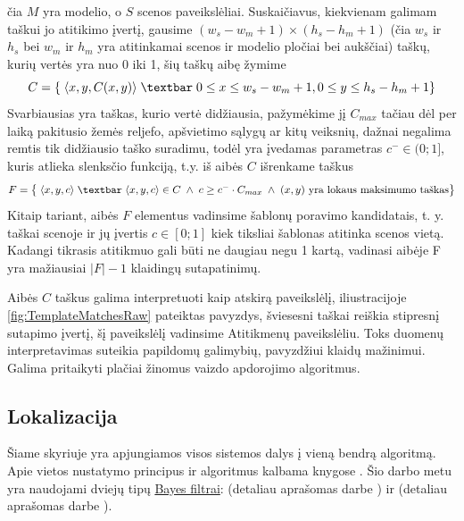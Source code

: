 \documentclass[a4paper,12pt]{article}
\begin{document}
		čia $M$ yra modelio, o $S$ scenos paveikslėliai. Suskaičiavus, kiekvienam galimam taškui jo atitikimo įvertį, gausime $(w_s-w_m+1) \times (h_s-h_m+1)$ (čia $w_s$ ir $h_s$ bei $w_m$ ir $h_m$ yra atitinkamai scenos ir modelio pločiai bei aukščiai) taškų, kurių vertės yra nuo 0 iki 1, šių taškų aibę žymime 
		\begin{equation}
		C =  \{\; \langle x, y, C(x,y) \rangle \; \textbar \; 0 \leq x \leq w_s-w_m+1, 0 \leq y \leq h_s-h_m+1\}
		\end{equation}
		Svarbiausias yra taškas, kurio vertė didžiausia, pažymėkime jį $C_{max}$ tačiau dėl per laiką pakitusio žemės reljefo, apšvietimo sąlygų ar kitų veiksnių, dažnai negalima remtis tik didžiausio taško suradimu, todėl yra įvedamas parametras $c^- \in (0;1]$, kuris atlieka slenksčio funkciją, t.y. iš aibės $C$ išrenkame taškus
		\begin{equation}
		\label{eq:TemplateMathingFilteredResult}
		 F = \left\{\; \langle x, y, c \rangle \; \textbar \; \langle x, y, c \rangle \in C  \; \land \; c \geq c^- \cdot C_{max} \; \land \; (x,y)\text{ yra lokaus maksimumo taškas} \right\}
		\end{equation}
		Kitaip tariant, aibės $F$ elementus vadinsime šablonų poravimo kandidatais, t. y. taškai scenoje ir jų įvertis $c \in [0;1]$ kiek tiksliai šablonas atitinka scenos vietą. Kadangi tikrasis atitikmuo gali būti ne daugiau negu 1 kartą, vadinasi aibėje F yra mažiausiai $|F| - 1$ klaidingų sutapatinimų. 
		
		Aibės $C$ taškus galima interpretuoti kaip atskirą paveikslėlį, iliustracijoje \ref{fig:TemplateMatchesRaw} pateiktas pavyzdys, šviesesni taškai reiškia stipresnį sutapimo įvertį, šį paveikslėlį vadinsime Atitikmenų paveikslėliu. Toks duomenų interpretavimas suteikia papildomų galimybių, pavyzdžiui klaidų mažinimui. Galima pritaikyti plačiai žinomus vaizdo apdorojimo algoritmus.		
				
	\subsection{Lokalizacija}	
		\label{sec:Localization}
				
		Šiame skyriuje yra apjungiamos visos sistemos dalys į vieną bendrą algoritmą. 
		Apie vietos nustatymo principus ir algoritmus kalbama knygose \cite{siegwart2011introduction, thrun2005probabilistic}. Šio darbo metu yra naudojami dviejų tipų \hyperref[sec:BayesFilter]{Bayes filtrai}:  (detaliau aprašomas darbe \cite{DesignEKF}) ir  (detaliau aprašomas darbe \cite{BaBl09}). 
						
\end{document}
